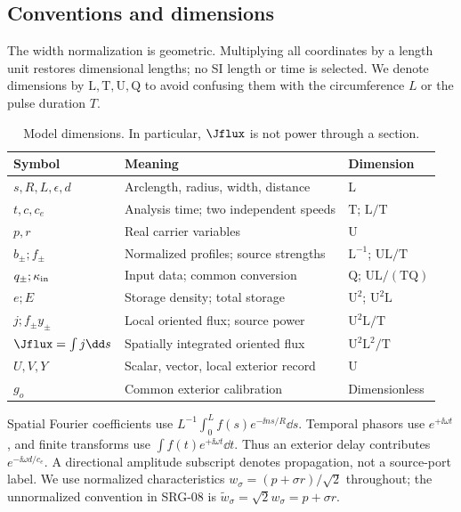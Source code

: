 \subsection{Conventions and dimensions}\label{sec:units}
The width normalization is geometric. Multiplying all coordinates by a length unit restores dimensional lengths; no SI length or time is selected. We denote dimensions by $\mathrm L,\mathrm T,\mathrm U,\mathrm Q$ to avoid confusing them with the circumference $L$ or the pulse duration $T$.
\begin{table}[htbp]\centering\small
\begin{tabular}{P{.29\textwidth}P{.35\textwidth}P{.23\textwidth}}\toprule
Symbol & Meaning & Dimension\\\midrule
$s,R,L,\epsilon,d$ & Arclength, radius, width, distance & $\mathrm L$\\
$t,c,c_e$ & Analysis time; two independent speeds & $\mathrm T$; $\mathrm L/\mathrm T$\\
$p,r$ & Real carrier variables & $\mathrm U$\\
$b_\pm; f_\pm$ & Normalized profiles; source strengths & $\mathrm L^{-1}$; $\mathrm U\mathrm L/\mathrm T$\\
$q_\pm;\kappa_{\rm in}$ & Input data; common conversion & $\mathrm Q$; $\mathrm U\mathrm L/(\mathrm T\mathrm Q)$\\
$e;E$ & Storage density; total storage & $\mathrm U^2$; $\mathrm U^2\mathrm L$\\
$j;f_\pm y_\pm$ & Local oriented flux; source power & $\mathrm U^2\mathrm L/\mathrm T$\\
$\Jflux=\int j\dd s$ & Spatially integrated oriented flux & $\mathrm U^2\mathrm L^2/\mathrm T$\\
$U,V,Y$ & Scalar, vector, local exterior record & $\mathrm U$\\
$g_o$ & Common exterior calibration & Dimensionless\\\bottomrule
\end{tabular}
\caption{Model dimensions. In particular, $\Jflux$ is not power through a section.}\label{tab:units}
\end{table}

Spatial Fourier coefficients use $L^{-1}\int_0^L f(s)e^{-\ii ns/R}\dd s$. Temporal phasors use $e^{+\ii\omega t}$, and finite transforms use $\int f(t)e^{+\ii\omega t}\dd t$. Thus an exterior delay contributes $e^{-\ii\omega d/c_e}$. A directional amplitude subscript denotes propagation, not a source-port label. We use normalized characteristics $w_\sigma=(p+\sigma r)/\sqrt2$ throughout; the unnormalized convention in SRG-08 is $\widetilde w_\sigma=\sqrt2w_\sigma=p+\sigma r$.

